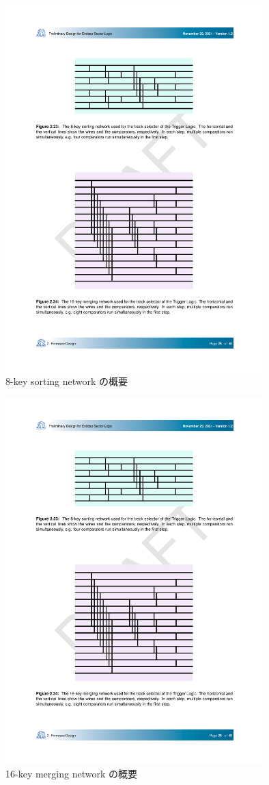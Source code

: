 \begin{figure} 
\centering
\includegraphics[width=10cm]{fig/SL/Sortiing_8key.pdf}
\caption[8-key sorting network の概要]{8-key sorting network の概要}
\label{Sortiing_8key}
\end{figure}

\begin{figure} 
\centering
\includegraphics[width=10cm]{fig/SL/Sorting_16.pdf}
\caption[16-key merging network の概要]{16-key merging network の概要}
\label{Sorting_16}
\end{figure}

